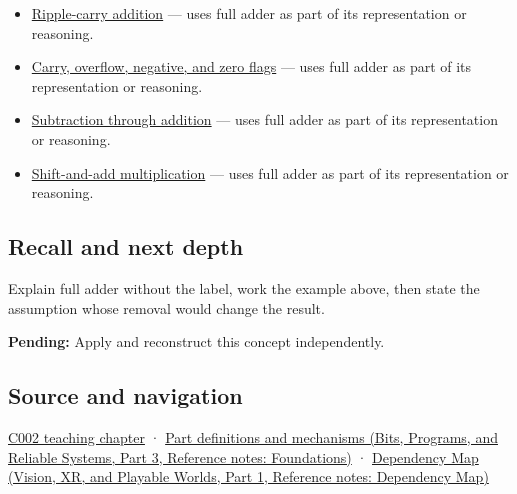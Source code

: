 \hypertarget{appendix-d1a5b1e520c2-used-by}{}

\begin{itemize}
\tightlist
\item
  \hyperref[appendix-17917d9fdbe3]{Ripple-carry addition} --- uses full adder as part of its representation or reasoning.
\item
  \hyperref[appendix-8d687c9c08ab]{Carry, overflow, negative, and zero flags} --- uses full adder as part of its representation or reasoning.
\item
  \hyperref[appendix-1c7df340573e]{Subtraction through addition} --- uses full adder as part of its representation or reasoning.
\item
  \hyperref[appendix-a65290d66ed9]{Shift-and-add multiplication} --- uses full adder as part of its representation or reasoning.
\end{itemize}

\subsection{Recall and next depth}\label{appendix-d1a5b1e520c2-recall-and-next-depth}

\hypertarget{appendix-d1a5b1e520c2-recall-and-next-depth}{}

Explain full adder without the label, work the example above, then state the assumption whose removal would change the result.

\textbf{Pending:} Apply and reconstruct this concept independently.

\subsection{Source and navigation}\label{appendix-d1a5b1e520c2-source-and-navigation}

\hypertarget{appendix-d1a5b1e520c2-source-and-navigation}{}

\hyperref[01-foundations-i-ch001-arithmetic-becomes-a-policy]{C002 teaching chapter} · \href{../01-Bits-Programs-and-Reliable-Systems-P03/main.pdf\#nameddest=appendix-fd090d982a15}{Part definitions and mechanisms (Bits, Programs, and Reliable Systems, Part 3, Reference notes: Foundations)} · \href{../07-Vision-XR-and-Playable-Worlds-P01/main.pdf\#nameddest=appendix-4ad47bdd269a}{Dependency Map (Vision, XR, and Playable Worlds, Part 1, Reference notes: Dependency Map)}
